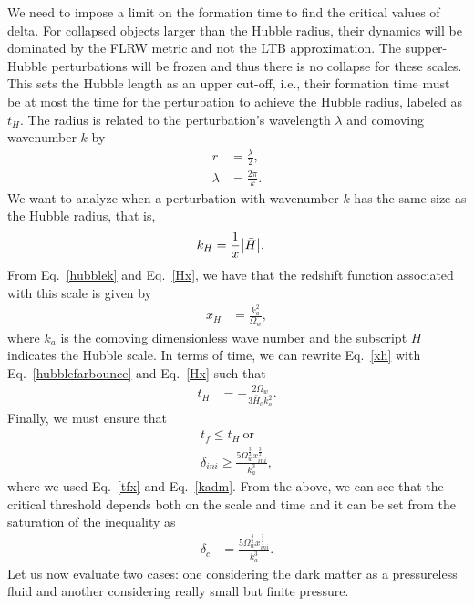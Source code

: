 \documentclass[a4paper,11pt]{article}
\begin{document}
We need to impose a limit on the formation time to find the critical values of delta. For collapsed objects larger than the Hubble radius, their dynamics will be dominated by the FLRW metric and not the LTB approximation. The supper-Hubble perturbations will be frozen and thus there is no collapse for these scales. This sets the Hubble length as an upper cut-off, i.e., their formation time must be at most the time for the perturbation to achieve the Hubble radius, labeled as $t_H$.  The radius is related to the perturbation's wavelength $\lambda$ and comoving wavenumber $k$ by~\cite{Quintin2016}
\begin{align}
	\label{radius}
	r       & =\frac{\lambda}{2}, \\
	\label{wavelength}
	\lambda & = \frac{2 \pi}{k}.
\end{align}
We want to analyze when a perturbation with wavenumber $k$ has the same size as the Hubble radius, that is,
\begin{align}
	\label{hubblek}
	k_H & = \frac{1}{x}\abs{\Bar{H}}
	.\end{align}
From Eq.~\eqref{hubblek} and Eq.~\eqref{Hx}, we have that the redshift function associated with this scale is given by
\begin{align}
	\label{xh}
	x_H & = \frac{k_a^2 }{\Omega_w}
	,\end{align}
where $k_a$ is the comoving dimensionless wave number and the subscript $H$ indicates the Hubble scale. In terms of time, we can rewrite Eq.~\eqref{xh} with Eq.~\eqref{hubblefarbounce} and Eq.~\eqref{Hx} such that
\begin{align}
	t_H & = -\frac{2\Omega_w}{3 \bar{H}_0 k_a^2}
	.\end{align}
Finally, we must ensure that
\begin{align}
	\label{deltacf}
	t_f \leq t_H ~\text{or}\nonumber \\
	\delta_{ini} \geq \frac{5\Omega_w^{\frac{3}{2}} x_{ini}^{\frac{3}{2}}}{k_a^3}
	,\end{align}
where we used Eq.~\eqref{tfx} and Eq.~\eqref{kadm}. From the above, we can see that the critical threshold depends both on the scale and time and it can be set from the saturation of the inequality as
\begin{align}
	\label{deltacfinal}
	\delta_c & =
	\frac{5 \Omega_w^{\frac{3}{2}} x_{ini}^{\frac{3}{2}}}{k_a^3}
	.\end{align}
Let us now evaluate two cases: one considering the dark matter as a pressureless fluid and another considering really small but finite pressure.
\end{document}
